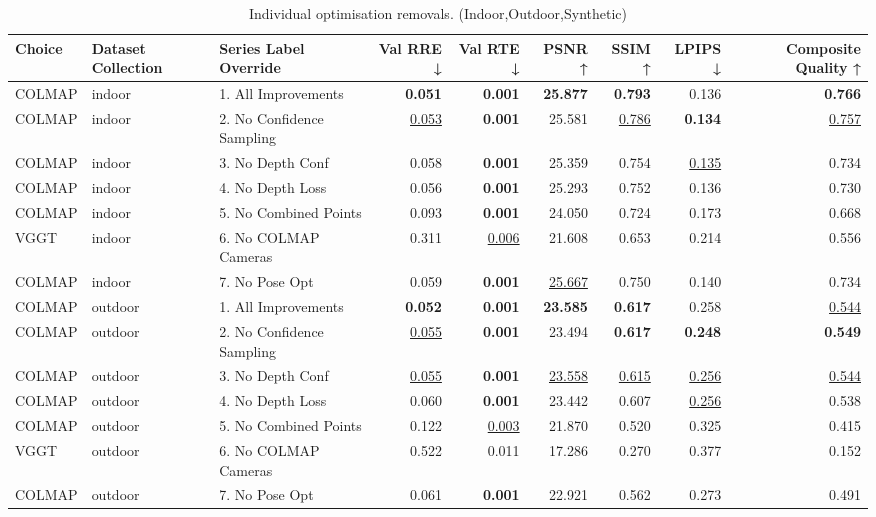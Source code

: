 \begin{table}[H]
\caption{\ifdefined\customcaption \customcaption \else Individual optimisation removals. (Indoor,Outdoor,Synthetic) \fi}
\label{tab:99_all_improvements_removals_indoor,outdoor,synthetic}
\centering
\scriptsize
\begin{tabular}{lllrrrrrr}
\toprule
Choice & Dataset Collection & Series Label Override & Val RRE ↓ & Val RTE ↓ & PSNR ↑ & SSIM ↑ & LPIPS ↓ & Composite Quality ↑ \\
\midrule
COLMAP & indoor & 1. All Improvements & \textbf{0.051} & \textbf{0.001} & \textbf{25.877} & \textbf{0.793} & 0.136 & \textbf{0.766} \\
COLMAP & indoor & 2. No Confidence Sampling & \underline{0.053} & \textbf{0.001} & 25.581 & \underline{0.786} & \textbf{0.134} & \underline{0.757} \\
COLMAP & indoor & 3. No Depth Conf & 0.058 & \textbf{0.001} & 25.359 & 0.754 & \underline{0.135} & 0.734 \\
COLMAP & indoor & 4. No Depth Loss & 0.056 & \textbf{0.001} & 25.293 & 0.752 & 0.136 & 0.730 \\
COLMAP & indoor & 5. No Combined Points & 0.093 & \textbf{0.001} & 24.050 & 0.724 & 0.173 & 0.668 \\
VGGT & indoor & 6. No COLMAP Cameras & 0.311 & \underline{0.006} & 21.608 & 0.653 & 0.214 & 0.556 \\
COLMAP & indoor & 7. No Pose Opt & 0.059 & \textbf{0.001} & \underline{25.667} & 0.750 & 0.140 & 0.734 \\
\midrule
COLMAP & outdoor & 1. All Improvements & \textbf{0.052} & \textbf{0.001} & \textbf{23.585} & \textbf{0.617} & 0.258 & \underline{0.544} \\
COLMAP & outdoor & 2. No Confidence Sampling & \underline{0.055} & \textbf{0.001} & 23.494 & \textbf{0.617} & \textbf{0.248} & \textbf{0.549} \\
COLMAP & outdoor & 3. No Depth Conf & \underline{0.055} & \textbf{0.001} & \underline{23.558} & \underline{0.615} & \underline{0.256} & \underline{0.544} \\
COLMAP & outdoor & 4. No Depth Loss & 0.060 & \textbf{0.001} & 23.442 & 0.607 & \underline{0.256} & 0.538 \\
COLMAP & outdoor & 5. No Combined Points & 0.122 & \underline{0.003} & 21.870 & 0.520 & 0.325 & 0.415 \\
VGGT & outdoor & 6. No COLMAP Cameras & 0.522 & 0.011 & 17.286 & 0.270 & 0.377 & 0.152 \\
COLMAP & outdoor & 7. No Pose Opt & 0.061 & \textbf{0.001} & 22.921 & 0.562 & 0.273 & 0.491 \\

\end{tabular}
\end{table}
